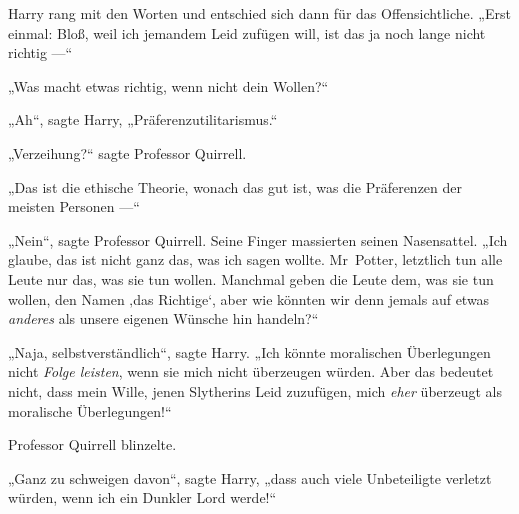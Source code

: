 Harry rang mit den Worten und entschied sich dann für das Offensichtliche.
„Erst einmal: Bloß, weil ich jemandem Leid zufügen will, ist das ja noch lange nicht richtig —“

„Was macht etwas richtig, wenn nicht dein Wollen?“

„Ah“, sagte Harry,
„Präferenzutilitarismus.“

„Verzeihung?“ sagte Professor Quirrell.

„Das ist die ethische Theorie, wonach das gut ist, was die Präferenzen der meisten Personen —“

„Nein“, sagte Professor Quirrell. Seine Finger massierten seinen Nasensattel.
„Ich glaube, das ist nicht ganz das, was ich sagen wollte. Mr~Potter, letztlich tun alle Leute nur das, was sie tun wollen. Manchmal geben die Leute dem, was sie tun wollen, den Namen ‚das Richtige‘, aber wie könnten wir denn jemals auf etwas \emph{anderes} als unsere eigenen Wünsche hin handeln?“

„Naja, selbstverständlich“, sagte Harry.
„Ich könnte moralischen Überlegungen nicht \emph{Folge leisten}, wenn sie mich nicht überzeugen würden. Aber das bedeutet nicht, dass mein Wille, jenen Slytherins Leid zuzufügen, mich \emph{eher} überzeugt als moralische Überlegungen!“

Professor Quirrell blinzelte.

„Ganz zu schweigen davon“, sagte Harry, „dass auch viele Unbeteiligte verletzt würden, wenn ich ein Dunkler Lord werde!“

